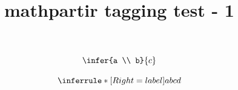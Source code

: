 \documentclass{article}
\title{mathpartir tagging test - 1}
\begin{document}
\[ \infer{a \\ b}{c} \]

\[ \inferrule*[Right={label}]{a \\\\ b}{c \\ d} \]
\end{document}
